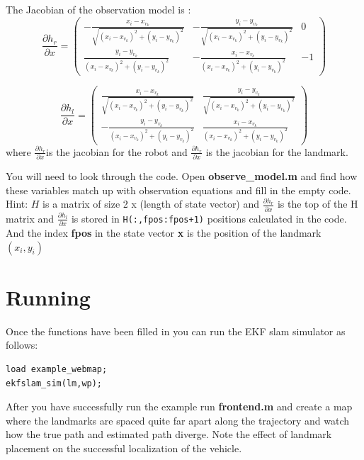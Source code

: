 \documentclass[a4, 10pt]{article}
\begin{document}
\def \dx {x_i - x_{v_k}}
\def \dy { y_i - y_{v_k}}
\def \d {\sqrt{\ds}}
\def \ds {\left(\dx\right)^2 + \left(\dy\right)^2}


The Jacobian of the observation model is :
\begin{equation}
  \frac{\partial h_r}{\partial x} = \left( \begin{array}{ccc}
   -\frac{\dx}{\d} & -\frac{\dy}{\d} & 0  \\
    \frac{\dy}{\ds} & -\frac{\dx}{\ds} & -1
     \end{array} \right) 
      \end{equation}

\begin{equation}
  \frac{\partial h_l}{\partial x} = \left( \begin{array}{cc}
   \frac{\dx}{\d} & \frac{\dy}{\d}  \\
    -\frac{\dy}{\ds} & \frac{\dx}{\ds}
  \end{array} \right) 
\end{equation}
where $\frac{\partial h_r}{\partial x} $is the jacobian for the robot and 
$\frac{\partial h_r}{\partial x}$ is the jacobian for the landmark.

       
You will need to look through the code. Open
\textbf{observe\_model.m} and find how these variables match up
with observation equations and fill in the empty code. Hint:
$H$ is a matrix of size 2 x (length of state vector) and $\frac{\partial
  h_r}{\partial x} $ is the top of the H matrix and $\frac{\partial
  h_l}{\partial x}$ is stored in \verb|H(:,fpos:fpos+1)| positions
calculated in the code. And the index \textbf{fpos} in the
state vector \textbf{x} is the position of the landmark
$(x_i,y_i)$

\section{Running}
Once the functions have been filled in you can run the EKF slam simulator as follows:
\begin{verbatim}
load example_webmap;
ekfslam_sim(lm,wp);

\end{verbatim}

After you have successfully run the example run \textbf{frontend.m} and create a map where the landmarks are spaced quite far apart along the trajectory and watch how the true path and estimated path diverge. Note the effect of landmark placement on the successful localization of the vehicle.
\end{document}
